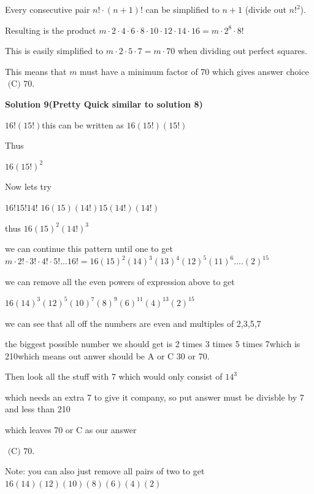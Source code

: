 \begin{enumerate}
 Every consecutive pair $n!\cdot(n+1)!$ can be simplified to $n+1$ (divide out $n!^2$).

 Resulting is the product $m\cdot2\cdot4\cdot6\cdot8\cdot10\cdot12\cdot14\cdot16 = m\cdot2^8\cdot8!$

 This is easily simplified to $m\cdot2\cdot5\cdot7 = m\cdot70$ when dividing out perfect squares. 

 This means that $m$ must have a minimum factor of $70$ which gives answer choice $\boxed{\text{ (C) }70}$.

 



\textbf{Solution 9(Pretty Quick similar to solution 8)}

$16!\left(15!\right)$this can be written as $16\left(15!\right)\left(15!\right)$

 
Thus 

 
$16\left(15!\right)^{2}$

 Now lets try 

 $16!15!14!$
$16\left(15\right)\left(14!\right)15\left(14!\right)\left(14!\right)$

 
thus $16\left(15\right)^{2}\left(14!\right)^{3}$

 
we can continue this pattern until one to get$m\cdot2!\cdot3!\cdot4!\cdot5!...16! = 16\left(15\right)^{2}\left(14\right)^{3}\left(13\right)^{4}\left(12\right)^{5}\left(11\right)^{6}....\left(2\right)^{15}$

 we can remove all the even powers of expression above to get 

 $16\left(14\right)^{3}\left(12\right)^{5}\left(10\right)^{7}\left(8\right)^{9}\left(6\right)^{11}\left(4\right)^{13}\left(2\right)^{15}$

 
we can see that all off the numbers are even and multiples of 2,3,5,7

 the biggest possible number we should get is 2 times 3 times 5 times 7which is 210which means out anwer should be A or C 30 or 70.

 Then look all the stuff with 7 which would only consist of ${14}^3$

 which needs an extra 7 to give it company, so put answer must be divisble by 7 and less than 210

 which leaves 70 or C as our answer

 $\boxed{\text{ (C) }70}$.

 Note: you can also just remove all pairs of two to get $16\left(14\right)\left(12\right)\left(10\right)\left(8\right)\left(6\right)\left(4\right)\left(2\right)$





\end{enumerate}
